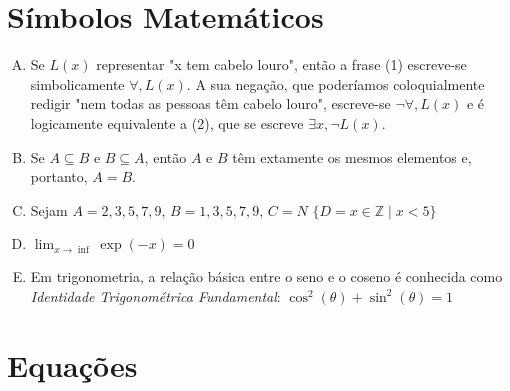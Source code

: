 \documentclass[a4paper, 11pt]{article}
\begin{document}
\section{Símbolos Matemáticos}

\begin{enumerate}[A)]
	\item Se $L(x)$ representar "x tem cabelo louro", então a frase (1) escreve-se
	simbolicamente $\forall, L(x)$. A sua negação, que poderíamos coloquialmente redigir
	"nem todas as pessoas têm cabelo louro", escreve-se $\neg\forall, L(x)$ e é logicamente equivalente
	a (2), que se escreve $\exists x, \neg L(x)$.

	\item Se $A \subseteq B$ e $B \subseteq A$, então $A$ e $B$ têm extamente os mesmos elementos e, portanto,  
		$A = B$.
	\item Sejam $A = 2, 3, 5, 7, 9$, $B = 1, 3, 5, 7, 9$, $C = N$
		  $\{D = x \in  \mathbb{Z}  \mid x < 5 \}$
	\item  $\lim_{x \to \inf} \exp(-x) = 0$
	\item Em trigonometria, a relação básica entre o seno e o coseno é conhecida 
	como \emph{Identidade Trigonométrica Fundamental}: $ \cos ^2(\theta) + \sin ^2(\theta) = 1$ 
\end{enumerate}


\section{Equações}	
\end{document}

